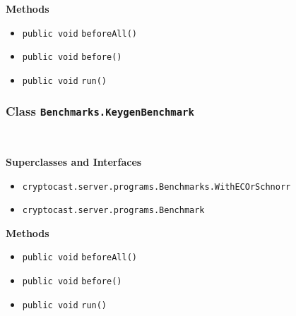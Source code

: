 \textbf{\sffamily Methods}
\begin{itemize}
\item \lstinline|public void| \lstinline|beforeAll|\lstinline|()| \\[-0.6em]




\item \lstinline|public void| \lstinline|before|\lstinline|()| \\[-0.6em]




\item \lstinline|public void| \lstinline|run|\lstinline|()| \\[-0.6em]




\end{itemize}

\subsubsection{Class \lstinline|Benchmarks.KeygenBenchmark|}
 \\
\noindent\begin{minipage}[t]{5cm}
\vspace{0.3em}
\hspace*{2em}
\vspace{0.3em}
\end{minipage}



\textbf{\sffamily Superclasses and Interfaces}
\begin{itemize}
\item \lstinline|cryptocast.server.programs.Benchmarks.WithECOrSchnorr|
\item \lstinline|cryptocast.server.programs.Benchmark|
\end{itemize}



\textbf{\sffamily Methods}
\begin{itemize}
\item \lstinline|public void| \lstinline|beforeAll|\lstinline|()| \\[-0.6em]




\item \lstinline|public void| \lstinline|before|\lstinline|()| \\[-0.6em]




\item \lstinline|public void| \lstinline|run|\lstinline|()| \\[-0.6em]




\end{itemize}


